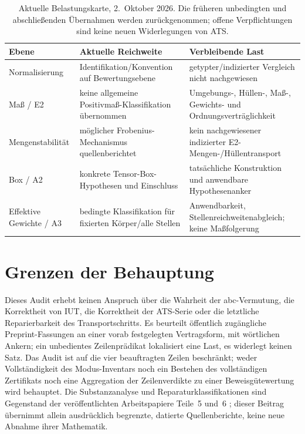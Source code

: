 \documentclass[11pt,a4paper]{article}
\begin{document}
\begin{table}[htbp]
\centering\footnotesize
\begin{tabularx}{\textwidth}{@{}l >{\raggedright\arraybackslash}X >{\raggedright\arraybackslash}X@{}}
\toprule
Ebene & Aktuelle Reichweite & Verbleibende Last \\
\midrule
Normalisierung & Identifikation/Konvention auf Bewertungsebene & getypter/indizierter Vergleich nicht nachgewiesen \\
Maß / E2 & keine allgemeine Positivmaß-Klassifikation übernommen & Umgebungs-, Hüllen-, Maß-, Gewichts- und Ordnungsverträglichkeit \\
Mengenstabilität & möglicher Frobenius-Mechanismus quellenberichtet & kein nachgewiesener indizierter E2-Mengen-/Hüllentransport \\
Box / A2 & konkrete Tensor-Box-Hypothesen und Einschluss & tatsächliche Konstruktion und anwendbare Hypothesenanker \\
Effektive Gewichte / A3 & bedingte Klassifikation für fixierten Körper/alle Stellen & Anwendbarkeit, Stellenreichweitenabgleich; keine Maßfolgerung \\
\bottomrule
\end{tabularx}
\caption{Aktuelle Belastungskarte, 2.~Oktober 2026. Die früheren
unbedingten und abschließenden Übernahmen werden zurückgenommen;
offene Verpflichtungen sind keine neuen Widerlegungen von ATS.}
\label{tab:burden}
\end{table}

\clearpage
\section{Grenzen der Behauptung}\label{sec:claims}

Dieses Audit erhebt keinen Anspruch über die Wahrheit der abc-Vermutung, die
Korrektheit von IUT, die Korrektheit der ATS-Serie oder die letztliche
Reparierbarkeit des Transportschritts. Es beurteilt öffentlich zugängliche
Preprint-Fassungen an einer vorab festgelegten Vertragsform, mit wörtlichen
Ankern; ein unbedientes Zeilenprädikat lokalisiert eine Last, es widerlegt keinen
Satz. Das Audit ist auf die vier beauftragten Zeilen beschränkt; weder
Vollständigkeit des Modus-Inventars noch ein Bestehen des vollständigen
Zertifikats noch eine Aggregation der Zeilenverdikte zu einer
Beweisgütewertung wird behauptet. Die Substanzanalyse und Reparaturklassifikationen sind Gegenstand
der veröffentlichten Arbeitspapiere Teile~5 und~6
\cite{part5,part6}; dieser Beitrag übernimmt allein ausdrücklich
begrenzte, datierte Quellenberichte, keine neue Abnahme ihrer Mathematik.
\end{document}
